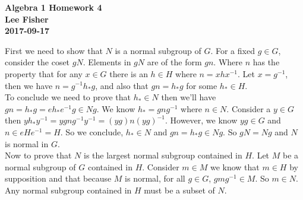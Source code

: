 \documentclass[12pt]{report}
\begin{document}
\textbf{Algebra 1 Homework 4}\\
\indent \textbf{Lee Fisher}\\
\indent \textbf{2017-09-17}

\vspace{0.3cm}


First we need to show that $N$ is a normal subgroup of $G$.
For a fixed $g \in G$, consider the coset $gN$. Elements in $gN$ are of the form
$gn$. Where $n$ has the property that for any $x \in G$ there is an $h \in H$
where $n = xhx^{-1}$. Let $x = g^{-1}$, then we have $n = g^{-1}h_*g$, and also
that $gn = h_*g$ for some $h_* \in H$.\\

To conclude we need to prove that $h_* \in N$ then we'll have $gn = h_*g =
eh_*e^{-1}g \in Ng$. We know $h_* = gng^{-1}$ where $n \in N$. Consider a
$y \in G$ then $yh_*y^{-1} = ygng^{-1}y^{-1} = (yg)n(yg)^{-1}$. However, we
know $yg \in G$ and $n \in eHe^{-1} = H$. So we conclude, $h_* \in N$ and $gn =
h_*g \in Ng$. So $gN = Ng$ and $N$ is normal in $G$.\\

Now to prove that $N$ is the largest normal subgroup contained in $H$. Let $M$
be a normal subgroup of $G$ contained in $H$. Consider $m \in M$ we know that
$m \in H$ by supposition and that because $M$ is normal, for all $g \in G$,
$gmg^{-1} \in M$. So $m \in N$. Any normal subgroup contained in $H$ must be a
subset of $N$.\\


\end{document}
